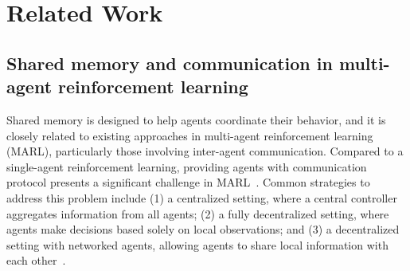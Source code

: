 \documentclass{article} %
\begin{document}

\section{Related Work}
\label{sec:related}
\subsection{Shared memory and communication in multi-agent reinforcement learning}

Shared memory is designed to help agents coordinate their behavior, and it is closely related to existing approaches in multi-agent reinforcement learning (MARL), particularly those involving inter-agent communication. Compared to a single-agent reinforcement learning, providing agents with communication protocol presents a significant challenge in MARL~\citep{NIPS2016_learning_to_communicate,DBLP:journals/corr/abs-1810-02912,pmlr-v80-zhang18n}. Common strategies to address this problem include (1) a centralized setting, where a central controller aggregates information from all agents; (2) a fully decentralized setting, where agents make decisions based solely on local observations; and (3) a decentralized setting with networked agents, allowing agents to share local information with each other~\citep{zhang2021multi,10314538,nayak2023scalablemultiagentreinforcementlearning,DBLP:journals/corr/abs-1906-01202}.
\end{document}
